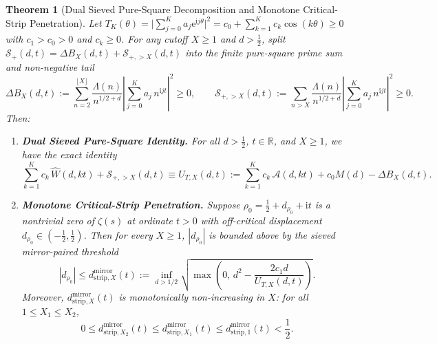 \documentclass[11pt,reqno]{amsart}
\newtheorem{theorem}{Theorem}[section]
\theoremstyle{definition}
\theoremstyle{remark}
\numberwithin{equation}{section}
\newcommand{\R}{\mathbb{R}}
\newcommand{\ee}{\mathrm{e}}
\newcommand{\ii}{\mathrm{i}}
\begin{document}
\begin{theorem}[Dual Sieved Pure-Square Decomposition and Monotone Critical-Strip Penetration]\label{thm:sieved_wall}
Let $T_K(\theta) = \bigl|\sum_{j=0}^K a_j \ee^{\ii j\theta}\bigr|^2 = c_0 + \sum_{k=1}^K c_k\cos(k\theta) \ge 0$ with $c_1 > c_0 > 0$ and $c_k \ge 0$. For any cutoff $X \ge 1$ and $d > \frac{1}{2}$, split $\mathcal{S}_+(d,t) = \Delta B_X(d,t) + \mathcal{S}_{+,>X}(d,t)$ into the finite pure-square prime sum and non-negative tail
\begin{equation}\label{eq:Delta_B_X_def}
\Delta B_X(d,t) := \sum_{n=2}^{\lfloor X\rfloor} \frac{\Lambda(n)}{n^{1/2+d}}\left|\sum_{j=0}^K a_j\,n^{\ii j t}\right|^2 \ge 0, \qquad \mathcal{S}_{+,>X}(d,t) := \sum_{n > X} \frac{\Lambda(n)}{n^{1/2+d}}\left|\sum_{j=0}^K a_j\,n^{\ii j t}\right|^2 \ge 0.
\end{equation}
Then:
\begin{enumerate}[label=\textup{(\roman*)},leftmargin=2.2em]
\item \textbf{Dual Sieved Pure-Square Identity.} For all $d > \frac{1}{2}$, $t \in \R$, and $X \ge 1$, we have the exact identity
\begin{equation}\label{eq:dual_sieved_id}
\sum_{k=1}^K c_k\,\widehat{W}(d,kt) + \mathcal{S}_{+,>X}(d,t) \equiv U_{T,X}(d,t) := \sum_{k=1}^K c_k\,\mathcal{A}(d,kt) + c_0 M(d) - \Delta B_X(d,t).
\end{equation}
\item \textbf{Monotone Critical-Strip Penetration.} Suppose $\rho_0 = \frac{1}{2} + d_{\rho_0} + \ii t$ is a nontrivial zero of $\zeta(s)$ at ordinate $t > 0$ with off-critical displacement $d_{\rho_0} \in (-\frac{1}{2}, \frac{1}{2})$. Then for every $X \ge 1$, $|d_{\rho_0}|$ is bounded above by the sieved mirror-paired threshold
\begin{equation}\label{eq:d_strip_mirror_X}
|d_{\rho_0}| \le d_{\mathrm{strip},X}^{\mathrm{mirror}}(t) := \inf_{d > 1/2} \sqrt{\max\!\left(0,\, d^2 - \frac{2c_1 d}{U_{T,X}(d,t)}\right)}.
\end{equation}
Moreover, $d_{\mathrm{strip},X}^{\mathrm{mirror}}(t)$ is monotonically non-increasing in $X$: for all $1 \le X_1 \le X_2$,
\begin{equation}\label{eq:d_strip_monotone}
0 \le d_{\mathrm{strip},X_2}^{\mathrm{mirror}}(t) \le d_{\mathrm{strip},X_1}^{\mathrm{mirror}}(t) \le d_{\mathrm{strip},1}^{\mathrm{mirror}}(t) < \frac{1}{2}.
\end{equation}
\end{enumerate}
\end{theorem}
\end{document}
